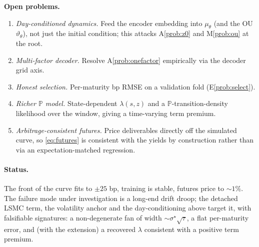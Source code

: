 \documentclass[11pt]{article}
\newcommand{\PP}{\mathbb{P}}
\begin{document}
\noindent\textbf{Open problems.}
\begin{enumerate}[leftmargin=*]
\item \emph{Day-conditioned dynamics.} Feed the encoder embedding into
$\mu_\theta$ (and the OU $\vartheta_\theta$), not just the initial condition;
this attacks A\ref{prob:z0} and M\ref{prob:ou} at the root.
\item \emph{Multi-factor decoder.} Resolve A\ref{prob:onefactor} empirically via
the decoder grid axis.
\item \emph{Honest selection.} Per-maturity bp RMSE on a validation fold
(E\ref{prob:select}).
\item \emph{Richer $\PP$ model.} State-dependent $\lambda(s,z)$ and a
$\PP$-transition-density likelihood over the window, giving a time-varying term
premium.
\item \emph{Arbitrage-consistent futures.} Price deliverables directly off the
simulated curve, so \eqref{eq:futures} is consistent with the yields by
construction rather than via an expectation-matched regression.
\end{enumerate}

\paragraph{Status.} The front of the curve fits to $\pm25$ bp, training is
stable, futures price to $\sim1\%$. The failure mode under investigation is a
long-end drift droop; the detached LSMC term, the volatility anchor and the
day-conditioning above target it, with falsifiable signatures: a
non-degenerate fan of width $\sim\sigma^\star\sqrt\tau$, a flat per-maturity
error, and (with the extension) a recovered $\lambda$ consistent with a
positive term premium.
\end{document}

